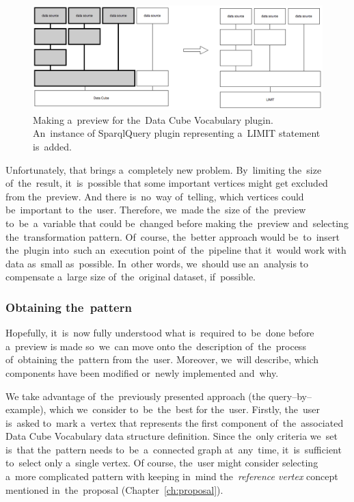 \begin{figure}
	\centering
	\includegraphics[width=140mm]{img/dcv-extraction-limit.png}
	\caption{Making a~preview for the~Data Cube Vocabulary plugin. An~instance of
	SparqlQuery plugin representing a~LIMIT statement is~added.}
	\label{fig:dcv-extraction-limit}
\end{figure}

Unfortunately, that brings a~completely new problem. By~limiting the~size of~the~result, it~is~possible that some important vertices might get excluded from the~preview.
And there is~no~way of~telling, which vertices could be~important to~the~user. Therefore, we~made the~size of~the~preview to~be~a~variable that could be~changed before making the~preview and~selecting the~transformation pattern. Of~course, the~better approach would be~to~insert the~plugin into~such an~execution point of~the~pipeline that it~would 
work with data as~small as~possible. In~other words, we~should use an~analysis 
to compensate a~large size of~the~original dataset, if~possible.



\subsubsection{Obtaining the~pattern}
Hopefully, it~is~now fully understood what is~required to~be~done before a~preview 
is made so~we~can move onto the~description of~the~process of~obtaining the~pattern 
from the~user. Moreover, we~will describe, which components have been 
modified or~newly implemented and~why.

\begin{sloppypar}
We take advantage of~the~previously presented approach (the query--by--example), which we~consider to~be~the~best for the~user. Firstly, the~user is~asked to~mark a~vertex that represents
the first component of~the~associated Data Cube Vocabulary data structure 
definition. Since the~only criteria we~set is~that the~pattern needs to~be~a~connected graph at~any~time, it~is~sufficient to~select only a~single vertex.
Of course, the~user might consider selecting a~more complicated pattern with keeping in~mind the~\emph{reference vertex} concept mentioned in~the~proposal (Chapter~\ref{ch:proposal}).
\end{sloppypar}

